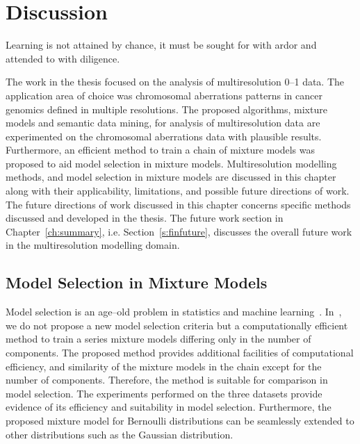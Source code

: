\chapter[Discussion]{Discussion}
\label{ch:discussion}

\begin{fquote}Learning is not attained by chance, 
it must be sought for with ardor and attended to with diligence.
 \end{fquote} 

\begin{synopsis}
The work in the thesis focused on the analysis of multiresolution 
0--1 data. The application area of choice was chromosomal 
aberrations patterns in cancer genomics defined in multiple 
resolutions. The proposed algorithms, mixture models and 
semantic data mining, for analysis of multiresolution data are 
experimented on the chromosomal aberrations data with plausible
results. Furthermore, an efficient method to train a chain of 
mixture models was proposed to aid model selection
in mixture models. Multiresolution modelling methods, and model
selection in mixture models are discussed in this chapter along
with their applicability, limitations, and possible future 
directions of work. The future directions of work discussed
in this chapter concerns specific methods discussed
and developed in the thesis. The future work section in 
Chapter~\ref{ch:summary}, i.e. Section~\ref{s:finfuture},
discusses the overall future work in the multiresolution 
modelling domain. 
\end{synopsis}



\section{Model Selection in Mixture Models}
\label{ss:dmodelselection}
Model selection is an age--old problem in statistics and machine 
learning~\cite{ando2010bayesian,lahiri2001model}. In~, 
we do not propose a new model selection criteria but a computationally 
efficient method to train a series mixture models differing only 
in the number of components. The proposed method provides 
additional facilities of computational efficiency, and similarity 
of the mixture models in the chain except for the number of 
components. Therefore, the method is suitable for comparison in 
model selection. The experiments performed on the three datasets
provide evidence of its efficiency and suitability in model 
selection. Furthermore, the proposed mixture model for Bernoulli
distributions can be seamlessly extended to other distributions
such as the Gaussian distribution. 

